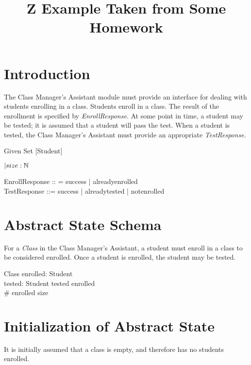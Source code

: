 \documentclass[letterpaper,11pt]{article}
\title{Z Example Taken from Some Homework}
\begin{document}
\maketitle

\section*{Introduction}

The Class Manager's Assistant module must provide an interface for dealing
with students enrolling in a class.  Students enroll in a class.  The result
of the enrollment is specified by \emph{EnrollResponse}.  At some point in
time, a student may be tested; it is assumed that a student will pass the
test.  When a student is tested, the Class Manager's Assistant must provide
an appropriate \emph{TestResponse}.

\vspace{1 em}

Given Set [Student]

    $| size: {\mathbb N}$
    \begin{zed}
    EnrollResponse :: = success | alreadyenrolled \\
    TestResponse ::= success | alreadytested | notenrolled \\
    \end{zed}

\section*{Abstract State Schema}

For a \emph{Class} in the Class Manager's Assistant, a student must enroll in
a class to be considered enrolled.  Once a student is enrolled, the student
may be tested.

    \begin{schema}{Class}
    enrolled:  Student \\
    tested:  Student
    \where
    tested \subseteq enrolled \\
    \# enrolled \leq size
    \end{schema}

\section*{Initialization of Abstract State}

It is initially assumed that a class is empty, and therefore has no students
enrolled.
\end{document}

